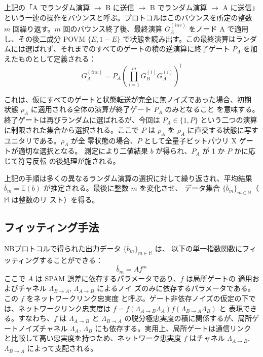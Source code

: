 \documentclass[12pt,a4paper,titlepage,dvipdfmx]{article}
\begin{document}
上記の「A でランダム演算 $\to$ B に送信 $\to$ B でランダム演算 $\to$ A に送信」という一連の操作をバウンスと呼ぶ。プロトコルはこのバウンスを所定の整数 $m$ 回繰り返す。$m$ 回のバウンス終了後、最終演算 $G_A^{(inv)}$ をノード A で適用し、その後二成分 POVM $\{E, 1-E\}$ で状態を読み出す。この最終演算はランダムには選ばれず、それまでのすべてのゲートの積の逆演算に終了ゲート $P_A$ を加えたものとして定義される：
\begin{equation}
G_A^{(inv)} = P_A \left( \prod_{i=1}^{m} G_B^{(i)} G_A^{(i)} \right)^\dagger
\end{equation}

これは、仮にすべてのゲートと状態転送が完全に無ノイズであった場合、初期
状態 $\rho_A$ に適用される全体の演算が終了ゲート $P_A$ のみとなること
を意味する。終了ゲートは再びランダムに選ばれるが、今回は $P_A \in \{1,
P\}$ という二つの演算に制限された集合から選択される。ここで $P$ は
$\rho_A$ を $\rho_A$ に直交する状態に写すユニタリである。$\rho_A$ が全
零状態の場合、$P$ として全量子ビットパウリ X ゲートが適切な選択となる。
測定により二値結果 $b$ が得られ、$P_A$ が 1 か $P$ かに応じて符号反転
の後処理が施される。

上記の手順は多くの異なるランダム演算の選択に対して繰り返され、平均結果
$\bar{b}_m = \mathbb{E}(b)$ が推定される。最後に整数 $m$ を変化させ、
データ集合 $\{\bar{b}_m\}_{m \in \mathbb{M}}$（$\mathbb{M}$ は整数のリ
スト）を得る。


\subsection{フィッティング手法}
NBプロトコルで得られた出力データ $\{\bar{b}_m\}_{m \in \mathbb{M}}$ は、
以下の単一指数関数にフィッティングすることができる：
\begin{equation}
\bar{b}_m = A f^m
\end{equation}
ここで $A$ は SPAM 誤差に依存するパラメータであり、$f$ は局所ゲートの
適用およびチャネル $\Lambda_{B \to A}$, $\Lambda_{A \to B}$ によるノイ
ズのみに依存するパラメータである。この $f$ をネットワークリンク忠実度
と呼ぶ。ゲート非依存ノイズの仮定の下では、ネットワークリンク忠実度は
$f = f(\Lambda_{A \to B} \Lambda_A) f(\Lambda_{B \to A} \Lambda_B)$ と
表現できる。すなわち、$f$ は $\Lambda_{A \to B}$ と $\Lambda_{B \to
A}$ の脱分極忠実度の積に関係するが、局所ゲートノイズチャネル
$\Lambda_A$, $\Lambda_B$ にも依存する。実用上、局所ゲートは通信リンク
と比較して高い忠実度を持つため、ネットワーク忠実度 $f$ はチャネル
$\Lambda_{A \to B}$, $\Lambda_{B \to A}$ によって支配される。
\end{document}
